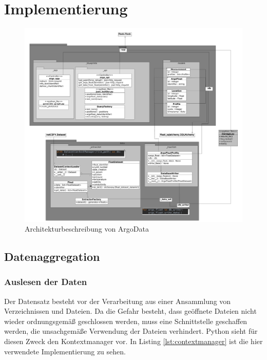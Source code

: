 \section{Implementierung}

\begin{figure}[h]
 \centering
 \includegraphics[width=\textwidth]{pix/Modulschema_komplett.png}
 \caption{Architekturbeschreibung von ArgoData}
 \label{fig:modulschema}
\end{figure}


\subsection{Datenaggregation}


\subsubsection{Auslesen der Daten}

Der Datensatz besteht vor der Verarbeitung aus einer Ansammlung von Verzeichnissen und Dateien. Da die Gefahr besteht, dass geöffnete Dateien nicht wieder ordnungsgemäß geschlossen werden, muss eine Schnittstelle geschaffen werden, die unsachgemäße Verwendung der Dateien verhindert. Python sieht für diesen Zweck den Kontextmanager vor. In Listing \ref{lst:contextmanager} ist die hier verwendete Implementierung zu sehen.
\pagebreak
{}

